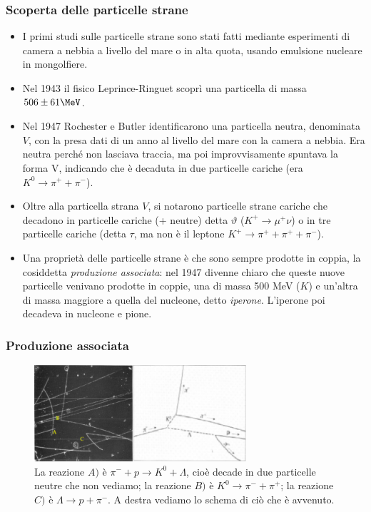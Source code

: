 \subsubsection{Scoperta delle particelle strane}
\begin{itemize}
    \item I primi studi sulle particelle strane sono stati fatti mediante esperimenti di camera a nebbia a livello del mare o in alta quota, usando emulsione nucleare in mongolfiere. 
    \item Nel 1943 il fisico Leprince-Ringuet scoprì una particella di massa $506\pm61\MeV$.
    \item Nel 1947 Rochester e Butler identificarono una particella neutra, denominata $V$, con la presa dati di un anno al livello del mare con la camera a nebbia. Era neutra perché non lasciava traccia, ma poi improvvisamente spuntava la forma V, indicando che è decaduta in due particelle cariche (era $K^0\to\pi^++\pi^-$).
    \item Oltre alla particella strana $V$, si notarono particelle strane cariche che decadono in particelle cariche (+ neutre) detta $\vartheta$ ($K^+\to\mu^+\nu$) o in tre particelle cariche (detta $\tau$, ma non è il leptone $K^+\to \pi^++\pi^++\pi^-$).
    \item Una proprietà delle particelle strane è che sono sempre prodotte in coppia, la cosiddetta \textit{produzione associata}: nel 1947 divenne chiaro che queste nuove particelle venivano prodotte in coppie, una di massa 500 MeV ($K$) e un'altra di massa maggiore a quella del nucleone, detto \textit{iperone}. L'iperone poi decadeva in nucleone e pione. 
\end{itemize}
\subsubsection{Produzione associata}
\begin{figure}[H]
    \centering
    \includegraphics[width=0.7\textwidth]{immagini/fig_bubb_chamb_strange.png}
    \caption{La reazione $A)$ è $\pi^-+p\to K^0+\Lambda$, cioè decade in due particelle neutre che non vediamo; la reazione $B)$ è $K^0\to\pi^-+\pi^+$; la reazione $C)$ è $\Lambda\to p+\pi^-$. A destra vediamo lo schema di ciò che è avvenuto.}
\end{figure}